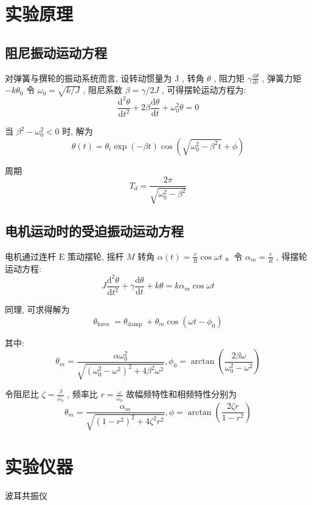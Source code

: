 \documentclass[UTF8]{ctexart}
\begin{document}
\section{实验原理}
    \subsection{阻尼振动运动方程} 



    对弹簧与撰轮的振动系统而言, 设转动惯量为  J , 转角  $\theta$ , 阻力矩
      $\gamma \frac{\mathrm{d} \theta}{\mathrm{d} t}$ , 弹簧力矩 $ -k \theta_{0} $ 令 $ \omega_{0}=\sqrt{k / J}$ , 阻尼系数 $ \beta=\gamma / 2 J$ , 可得摆轮运动方程为:
    $$
    \frac{\mathrm{d}^{2} \theta}{\mathrm{d} t^{2}}+2 \beta \frac{\mathrm{d} \theta}{\mathrm{d} t}+\omega_{0}^{2} \theta=0
    $$

    当  $\beta^{2}-\omega_{0}^{2}<0 $ 时, 解为
    $$
    \theta(t)=\theta_{i} \exp (-\beta t) \cos \left(\sqrt{\omega_{0}^{2}-\beta^{2} t}+\phi\right)
    $$

    周期
    $$
    T_{d}=\frac{2 \pi}{\sqrt{\omega_{0}^{2}-\beta^{2}}}
    $$

     \subsection{电机运动时的受迫振动运动方程} 
    电机通过连杆 $ \mathrm{E} $ 策动摆轮, 摇杆 $ M $ 转角 $ \alpha(t)=\frac{r}{R} \cos \omega t$  。令 $ \alpha_{m}=\frac{r}{R}$ , 得摆轮运动方程:
    $$
    J \frac{\mathrm{d}^{2} \theta}{\mathrm{d} t^{2}}+\gamma \frac{\mathrm{d} \theta}{\mathrm{d} t}+k \theta=k \alpha_{m} \cos \omega t
    $$

    同理, 可求得解为
    $$
    \theta_{\text {force }}=\theta_{\text {damp }}+\theta_{m} \cos \left(\omega t-\phi_{0}\right)
    $$

    其中:
    $$
    \theta_{m}=\frac{\alpha \omega_{0}^{2}}{\sqrt{\left(\omega_{0}^{2}-\omega^{2}\right)^{2}+4 \beta^{2} \omega^{2}}}, \phi_{0}=\arctan \left(\frac{2 \beta \omega}{\omega_{0}^{2}-\omega^{2}}\right)
    $$

    令阻尼比  $\zeta=\frac{\beta}{\omega_{0}}$ , 频率比 $ r=\frac{\omega}{\omega_{0}} $ 故幅频特性和相频特性分别为
    $$
    \theta_{m}=\frac{\alpha_{m}}{\sqrt{\left(1-r^{2}\right)^{2}+4 \zeta^{2} r^{2}}}, \phi=\arctan \left(\frac{2 \zeta r}{1-r^{2}}\right)
    $$

    \section{实验仪器}
    \noindent 波耳共振仪
\end{document}
